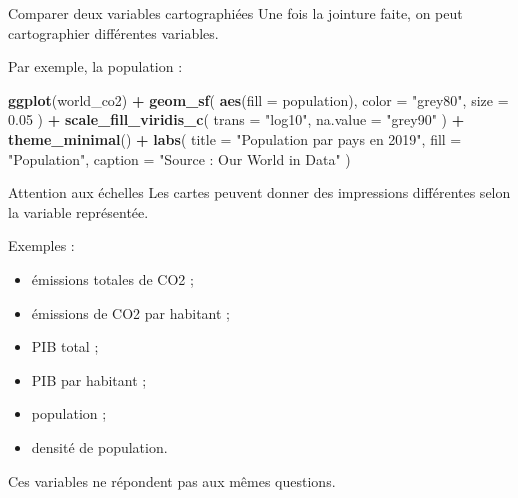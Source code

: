 \documentclass[
  10pt,
  ignorenonframetext,
]{beamer}
\newenvironment{Shaded}{\begin{snugshade}}{\end{snugshade}}
\newcommand{\AttributeTok}[1]{\textcolor[rgb]{0.13,0.29,0.53}{#1}}
\newcommand{\FloatTok}[1]{\textcolor[rgb]{0.00,0.00,0.81}{#1}}
\newcommand{\FunctionTok}[1]{\textcolor[rgb]{0.13,0.29,0.53}{\textbf{#1}}}
\newcommand{\NormalTok}[1]{#1}
\newcommand{\SpecialCharTok}[1]{\textcolor[rgb]{0.81,0.36,0.00}{\textbf{#1}}}
\newcommand{\StringTok}[1]{\textcolor[rgb]{0.31,0.60,0.02}{#1}}
\begin{document}
\begin{frame}[fragile]{Comparer deux variables cartographiées}
\label{comparer-deux-variables-cartographiuxe9es}
Une fois la jointure faite, on peut cartographier différentes variables.

Par exemple, la population :

\begin{Shaded}
\begin{Highlighting}[]
\FunctionTok{ggplot}\NormalTok{(world\_co2) }\SpecialCharTok{+}
  \FunctionTok{geom\_sf}\NormalTok{(}
    \FunctionTok{aes}\NormalTok{(}\AttributeTok{fill =}\NormalTok{ population),}
    \AttributeTok{color =} \StringTok{"grey80"}\NormalTok{,}
    \AttributeTok{size =} \FloatTok{0.05}
\NormalTok{  ) }\SpecialCharTok{+}
  \FunctionTok{scale\_fill\_viridis\_c}\NormalTok{(}
    \AttributeTok{trans =} \StringTok{"log10"}\NormalTok{,}
    \AttributeTok{na.value =} \StringTok{"grey90"}
\NormalTok{  ) }\SpecialCharTok{+}
  \FunctionTok{theme\_minimal}\NormalTok{() }\SpecialCharTok{+}
  \FunctionTok{labs}\NormalTok{(}
    \AttributeTok{title =} \StringTok{"Population par pays en 2019"}\NormalTok{,}
    \AttributeTok{fill =} \StringTok{"Population"}\NormalTok{,}
    \AttributeTok{caption =} \StringTok{"Source : Our World in Data"}
\NormalTok{  )}
\end{Highlighting}
\end{Shaded}
\end{frame}

\begin{frame}{Attention aux échelles}
\label{attention-aux-uxe9chelles}
Les cartes peuvent donner des impressions différentes selon la variable
représentée.

Exemples :

\begin{itemize}
  \item émissions totales de CO2 ;
  \item émissions de CO2 par habitant ;
  \item PIB total ;
  \item PIB par habitant ;
  \item population ;
  \item densité de population.
\end{itemize}

Ces variables ne répondent pas aux mêmes questions.
\end{frame}
\end{document}
